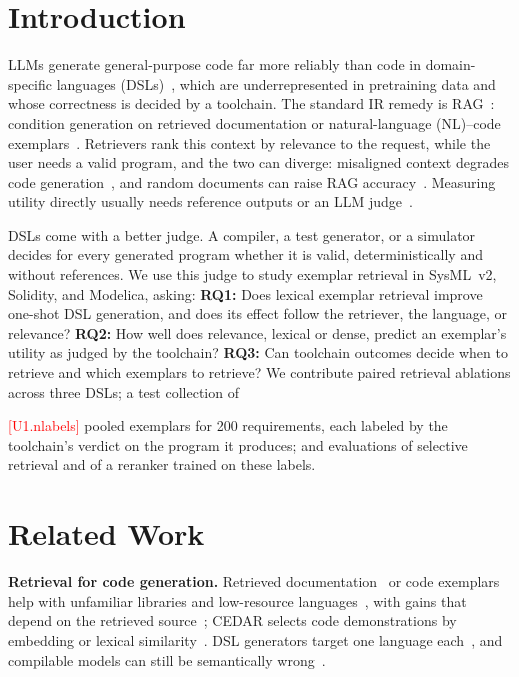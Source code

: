\documentclass[runningheads]{llncs}
\newcommand{\tbd}[1]{\ifbool{submission}%
  {\PackageError{forge}{Unfilled placeholder #1}{See the runbook placeholder table.}}%
  {\mbox{\textcolor{red}{\textsf{\tiny[#1]}}}}}
\begin{document}
\section{Introduction}
\label{sec:intro}

LLMs generate general-purpose code far more reliably than code in domain-specific languages (DSLs)~\cite{chen2021evaluating,joel2024lowresource}, which are underrepresented in pretraining data and whose correctness is decided by a toolchain. The standard IR remedy is RAG~\cite{lewis2020rag}: condition generation on retrieved documentation or natural-language (NL)--code exemplars~\cite{zhou2023docprompting,dutta2024rar}. Retrievers rank this context by relevance to the request, while the user needs a valid program, and the two can diverge: misaligned context degrades code generation~\cite{gu2025alliancecoder,wan2025modelica}, and random documents can raise RAG accuracy~\cite{cuconasu2024noise}. Measuring utility directly usually needs reference outputs or an LLM judge~\cite{salemi2024erag}.

DSLs come with a better judge. A compiler, a test generator, or a simulator decides for every generated program whether it is valid, deterministically and without references. We use this judge to study exemplar retrieval in SysML~v2, Solidity, and Modelica, asking:
\textbf{RQ1:} Does lexical exemplar retrieval improve one-shot DSL generation, and does its effect follow the retriever, the language, or relevance?
\textbf{RQ2:} How well does relevance, lexical or dense, predict an exemplar's utility as judged by the toolchain?
\textbf{RQ3:} Can toolchain outcomes decide when to retrieve and which exemplars to retrieve?
We contribute paired retrieval ablations across three DSLs; a test collection of \tbd{U1.nlabels} pooled exemplars for 200 requirements, each labeled by the toolchain's verdict on the program it produces; and evaluations of selective retrieval and of a reranker trained on these labels.

\section{Related Work}
\label{sec:related}

\textbf{Retrieval for code generation.} Retrieved documentation~\cite{zhou2023docprompting} or code exemplars~\cite{dutta2024rar} help with unfamiliar libraries and low-resource languages~\cite{cassano2024knowledge}, with gains that depend on the retrieved source~\cite{wang2025coderagbench}; CEDAR selects code demonstrations by embedding or lexical similarity~\cite{nashid2023cedar}. DSL generators target one language each~\cite{cibrian2025agent,bouamra2025systemp,peng2025soleval,luo2025fsm,xiang2025modigen,wan2025modelica}, and compilable models can still be semantically wrong~\cite{hendricks2025text2model}.
\end{document}

